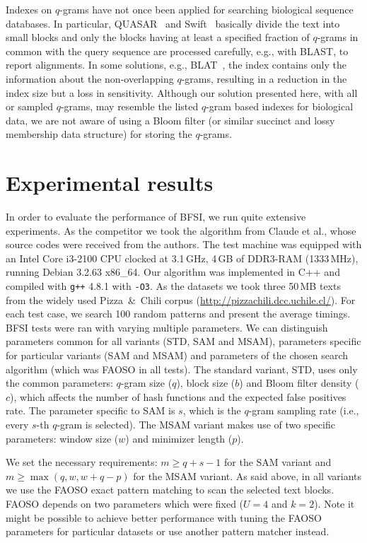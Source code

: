 \documentclass{llncs}
\begin{document}
Indexes on $q$-grams have not once been applied for searching 
biological sequence databases.
In particular, QUASAR~\cite{BCFLRV1999} and Swift~\cite{RSM2006} basically 
divide the text into small blocks and only the blocks having at least 
a specified fraction of $q$-grams in common with the query sequence 
are processed carefully, e.g., with BLAST, to report alignments.
In some solutions, e.g., BLAT~\cite{Kent2002blat}, the index contains 
only the information about the non-overlapping $q$-grams, resulting 
in a reduction in the index size but a loss in sensitivity.
Although our solution presented here, with all or sampled $q$-grams, 
may resemble the listed $q$-gram based indexes for biological data, 
we are not aware of using a Bloom filter (or similar succinct and lossy membership 
data structure) for storing the $q$-grams.



\section{Experimental results}
\label{sec:exp}

In order to evaluate the performance of BFSI, we run quite extensive 
experiments.
As the competitor we took the algorithm from Claude et al., whose 
source codes were received from the authors.
The test machine 
was equipped with an Intel Core i3-2100 CPU clocked at 3.1\,GHz,
4\,GB of DDR3-RAM (1333\,MHz), 
running Debian 3.2.63 x86\_64. 
Our algorithm 
was implemented in C++ 
and compiled with \texttt{g++} 4.8.1 with \texttt{-O3}. 
As the datasets we took 
three 
50\,MB texts from the 
widely used Pizza~\&~Chili corpus (\url{http://pizzachili.dcc.uchile.cl/}).
For each test case, 
we search 100 random patterns 
and present the average 
timings.
BFSI tests were ran with varying multiple parameters.
We can distinguish 
parameters common for all variants (STD, SAM and MSAM), 
parameters specific for particular variants (SAM and MSAM) 
and parameters of the chosen search algorithm 
(which was FAOSO in all tests). 
The standard variant, STD, uses only the common parameters:
$q$-gram size ($q$), block size ($b$) and Bloom filter density 
($c$), which affects the number of hash functions and the expected 
false positives rate. 
The parameter specific to SAM is $s$, 
which is the 
$q$-gram sampling rate 
(i.e., every $s$-th $q$-gram is selected).
The MSAM variant makes use of two specific parameters: 
window size ($w$) and minimizer length ($p$). 

We set the necessary requirements:
$m \geq q + s - 1$ for the SAM variant 
and
$m \geq \max(q, w, w + q - p)$ for the MSAM variant.
As said above, in all variants we use the FAOSO exact pattern matching 
to scan the selected text blocks.
FAOSO depends on two parameters which were fixed 
($U = 4$ and $k = 2$). 
Note it might be possible to achieve better performance with tuning the FAOSO 
parameters for particular datasets or use another pattern matcher instead.
\end{document}
